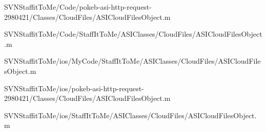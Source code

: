 \begin{DoxyCompactItemize}
\-S\-V\-N\-Staffit\-To\-Me/\-Code/pokeb-\/asi-\/http-\/request-\/2980421/\-Classes/\-Cloud\-Files/\-A\-S\-I\-Cloud\-Files\-Object.\-m\item 
\-S\-V\-N\-Staffit\-To\-Me/\-Code/\-Staff\-It\-To\-Me/\-A\-S\-I\-Classes/\-Cloud\-Files/\-A\-S\-I\-Cloud\-Files\-Object.\-m\item 
\-S\-V\-N\-Staffit\-To\-Me/ios/\-My\-Code/\-Staff\-It\-To\-Me/\-A\-S\-I\-Classes/\-Cloud\-Files/\-A\-S\-I\-Cloud\-Files\-Object.\-m\item 
\-S\-V\-N\-Staffit\-To\-Me/ios/pokeb-\/asi-\/http-\/request-\/2980421/\-Classes/\-Cloud\-Files/\-A\-S\-I\-Cloud\-Files\-Object.\-m\item 
\-S\-V\-N\-Staffit\-To\-Me/ios/\-Staff\-It\-To\-Me/\-A\-S\-I\-Classes/\-Cloud\-Files/\-A\-S\-I\-Cloud\-Files\-Object.\-m\end{DoxyCompactItemize}
